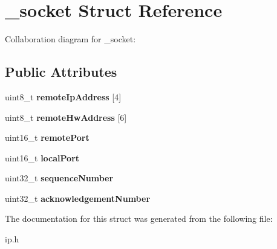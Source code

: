 \hypertarget{struct__socket}{}\section{\+\_\+socket Struct Reference}
\label{struct__socket}


Collaboration diagram for \+\_\+socket\+:
\subsection*{Public Attributes}
\begin{DoxyCompactItemize}
\item 
\mbox{\label{struct__socket_ae438161156389061a3308dd497f2b09f}} 
uint8\+\_\+t {\bfseries remote\+Ip\+Address} \mbox{[}4\mbox{]}
\item 
\mbox{\label{struct__socket_a311f2b383d551ded4600d615c694b017}} 
uint8\+\_\+t {\bfseries remote\+Hw\+Address} \mbox{[}6\mbox{]}
\item 
\mbox{\label{struct__socket_a935bf244e1d1690304b3f458b2027c22}} 
uint16\+\_\+t {\bfseries remote\+Port}
\item 
\mbox{\label{struct__socket_ad983682309ef0025642a48f6aa333524}} 
uint16\+\_\+t {\bfseries local\+Port}
\item 
\mbox{\label{struct__socket_a2f8ccd3dae23cc49d1a81bbcbba14ef5}} 
uint32\+\_\+t {\bfseries sequence\+Number}
\item 
\mbox{\label{struct__socket_a8ccfcadbddb377faf81d9a8e9a72e58f}} 
uint32\+\_\+t {\bfseries acknowledgement\+Number}
\end{DoxyCompactItemize}


The documentation for this struct was generated from the following file\+:\begin{DoxyCompactItemize}
\item 
ip.\+h\end{DoxyCompactItemize}
